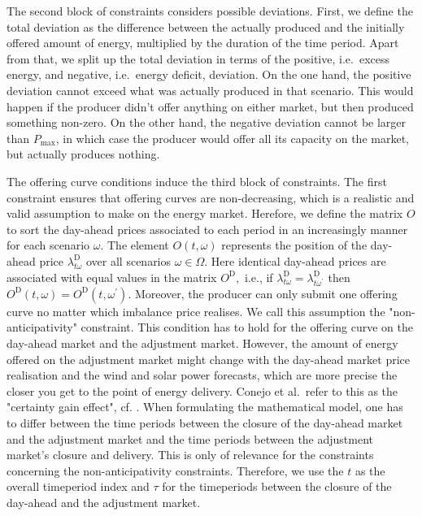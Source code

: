 The second block of constraints considers possible deviations. First, we define the total deviation as the difference between the actually produced and the initially offered amount of energy, multiplied by the duration of the time period. Apart from that, we split up the total deviation in terms of the positive, i.e.\ excess energy, and negative, i.e.\ energy deficit, deviation. On the one hand, the positive deviation cannot exceed what was actually produced in that scenario. This would happen if the producer didn't offer anything on either market, but then produced something non-zero. On the other hand, the negative deviation cannot be larger than $P_{\max}$, in which case the producer would offer all its capacity on the market, but actually produces nothing. 

The offering curve conditions induce the third block of constraints. The first constraint ensures that offering curves are non-decreasing, which is a realistic and valid assumption to make on the energy market. Herefore, we define the matrix $O$ to sort the day-ahead prices associated to each period in an increasingly manner for each scenario $\omega .$ The element $O(t, \omega)$ represents the position of the day-ahead price $\lambda_{t \omega}^{\mathrm{D}}$ over all scenarios $\omega \in \Omega$. Here identical day-ahead prices are associated with equal values in the matrix $O^{\mathrm{D}},$ i.e., if $\lambda_{t \omega}^{\mathrm{D}}=\lambda_{t \omega^{\prime}}^{\mathrm{D}}$ then $O^{\mathrm{D}}(t, \omega)=O^{\mathrm{D}}\left(t, \omega^{\prime}\right).$ Moreover, the producer can only submit one offering curve no matter which imbalance price realises. We call this assumption the "non-anticipativity" constraint. This condition has to hold for the offering curve on the day-ahead market and the adjustment market. However, the amount of energy offered on the adjustment market might change with the day-ahead market price realisation and the wind and solar power forecasts, which are more precise the closer you get to the point of energy delivery. Conejo et al.\ refer to this as the "certainty gain effect", cf. \cite{Conejo10}. When formulating the mathematical model, one has to differ between the
time periods between the closure of the day-ahead market and the adjustment market and
the time periods between the adjustment market's closure and delivery.  This is only of relevance for the constraints concerning the non-anticipativity constraints. Therefore, we use the $t$ as the overall timeperiod index and $\tau$ for the timeperiods between the closure of the day-ahead and the adjustment market.

